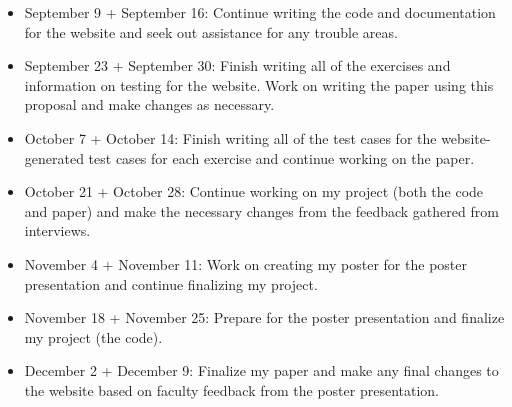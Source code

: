 \documentclass[10pt,twocolumn]{article}
\begin{document}
\begin{itemize}
    \item{September 9 + September 16: Continue writing the code and documentation for the website and seek out assistance for any trouble areas.}
    \item{September 23 + September 30: Finish writing all of the exercises and information on testing for the website. Work on writing the paper using this proposal and make changes as necessary.}
    \item{October 7 + October 14: Finish writing all of the test cases for the website-generated test cases for each exercise and continue working on the paper.}
    \item{October 21 + October 28: Continue working on my project (both the code and paper) and make the necessary changes from the feedback gathered from interviews.}
    \item{November 4 + November 11: Work on creating my poster for the poster presentation and continue finalizing my project.}
    \item{November 18 + November 25: Prepare for the poster presentation and finalize my project (the code).}
    \item{December 2 + December 9: Finalize my paper and make any final changes to the website based on faculty feedback from the poster presentation.}
\end{itemize}

\printbibliography
\end{document}
